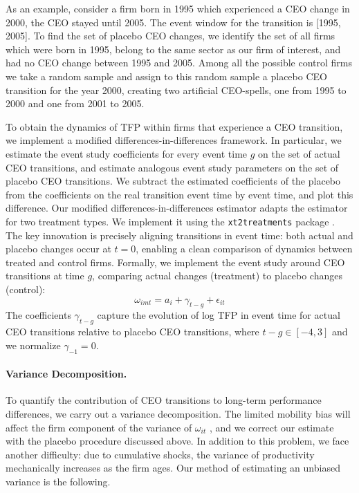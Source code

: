 \documentclass[11pt,a4paper]{article}
\begin{document}
As an example, consider a firm born in 1995 which experienced a CEO change in 2000, the CEO stayed until 2005. The event window for the transition is [1995, 2005]. To find the set of placebo CEO changes, we identify the set of all firms which were born in 1995, belong to the same sector as our firm of interest, and had no CEO change between 1995 and 2005. Among all the possible control firms we take a random sample and assign to this random sample a placebo CEO transition for the year 2000, creating two artificial CEO-spells, one from 1995 to 2000 and one from 2001 to 2005.

To obtain the dynamics of TFP within firms that experience a CEO transition, we implement a modified differences-in-differences framework. In particular, we estimate the event study coefficients for every event time $g$ on the set of actual CEO transitions, and estimate analogous event study parameters on the set of placebo CEO transitions. We subtract the estimated coefficients of the placebo from the coefficients on the real transition event time by event time, and plot this difference. Our modified differences-in-differences estimator adapts the \citet{Callaway2021JoLE} estimator for two treatment types. We implement it using the \texttt{xt2treatments} package \citep{Koren2024xt2treatments}. The key innovation is precisely aligning transitions in event time: both actual and placebo changes occur at $t=0$, enabling a clean comparison of dynamics between treated and control firms. 
Formally, we implement the event study around CEO transitions at time $g$, comparing actual changes (treatment) to placebo changes (control):
\begin{equation}
\omega_{imt} = a_i + \gamma_{t-g} + \epsilon_{it}
\end{equation}
The coefficients $\gamma_{t-g}$ capture the evolution of log TFP in event time for actual CEO transitions relative to placebo CEO transitions, where $t-g \in [-4, 3]$ and we normalize $\gamma_{-1} = 0$.


\paragraph{Variance Decomposition.} To quantify the contribution of CEO transitions to long-term performance differences, we carry out a variance decomposition. The limited mobility bias will affect the firm component of the variance of $\omega_{it}$ \citep{kline2024firm}, and we correct our estimate with the placebo procedure discussed above. In addition to this problem, we face another difficulty: due to cumulative shocks, the variance of productivity mechanically increases as the firm ages. Our method of estimating an unbiased variance is the following.
\end{document}
